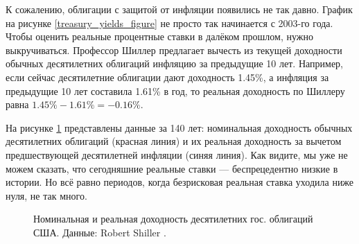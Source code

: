 К сожалению, облигации с защитой от инфляции появились не так давно. График на рисунке \ref{treasury_yields_figure} не просто так начинается с 2003-го года. Чтобы оценить реальные процентные ставки в далёком прошлом, нужно выкручиваться. Профессор Шиллер предлагает вычесть из текущей доходности обычных десятилетних облигаций инфляцию за предыдущие 10 лет. Например, если сейчас десятилетние облигации дают доходность 1.45\%, а инфляция за предыдущие 10 лет составила 1.61\% в год, то реальная доходность по Шиллеру равна $1.45\% - 1.61\% = -0.16\%$.

На рисунке \ref{long_run_interest_rates} представлены данные за 140 лет: номинальная доходность обычных десятилетних облигаций (красная линия) и их реальная доходность за вычетом предшествующей десятилетней инфляции (синяя линия). Как видите, мы уже не можем сказать, что сегодняшние реальные ставки --- беспрецедентно низкие в истории. Но всё равно периодов, когда безрисковая реальная ставка уходила ниже нуля, не так много.



\begin{figure}[ht]
\centering
{}
\caption{Номинальная и реальная доходность десятилетних гос. облигаций США. Данные: Robert Shiller \cite{shillerOnline}.}
\label{long_run_interest_rates}
\end{figure}

